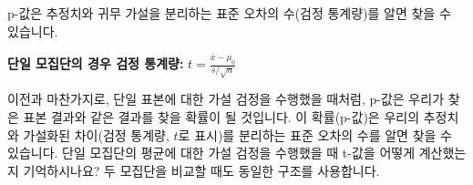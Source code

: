 \documentclass[11pt,a4paper]{article}
\begin{document}
\begin{tcolorbox}[mybox, title=두 브랜드 비교 (5/8): 3단계 - p-값 계산 (기본 원리)]
p-값은 추정치와 귀무 가설을 분리하는 표준 오차의 수(검정 통계량)를 알면 찾을 수 있습니다.

\textbf{단일 모집단의 경우 검정 통계량:}
$t = \frac{\bar{x} - \mu_0}{s/\sqrt{n}}$

이전과 마찬가지로, 단일 표본에 대한 가설 검정을 수행했을 때처럼, p-값은 우리가 찾은 표본 결과와 같은 결과를 찾을 확률이 될 것입니다. 이 확률(p-값)은 우리의 추정치와 가설화된 차이(검정 통계량, $t$로 표시)를 분리하는 표준 오차의 수를 알면 찾을 수 있습니다.
단일 모집단의 평균에 대한 가설 검정을 수행했을 때 t-값을 어떻게 계산했는지 기억하시나요? 두 모집단을 비교할 때도 동일한 구조를 사용합니다.
\end{tcolorbox}
\end{document}

